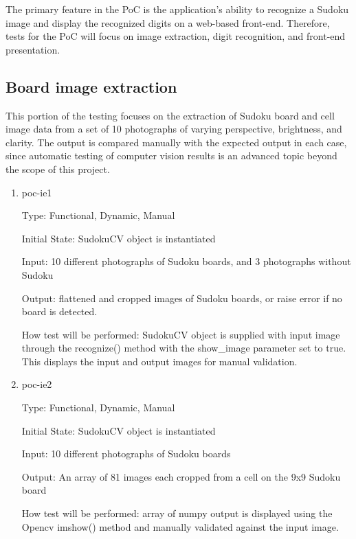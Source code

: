 \documentclass[11pt]{article}
\begin{document}
The primary feature in the PoC is the application's ability to recognize a Sudoku image and display the recognized digits on a web-based front-end. Therefore, tests for the PoC will focus on image extraction, digit recognition, and front-end presentation.

\subsection{Board image extraction}
		
This portion of the testing focuses on the extraction of Sudoku board and cell image data from a set of 10 photographs of varying perspective, brightness, and clarity. The output is compared manually with the expected output in each case, since automatic testing of computer vision results is an advanced topic beyond the scope of this project.

\begin{enumerate}

\item{poc-ie1\\}

Type: Functional, Dynamic, Manual
					
Initial State: SudokuCV object is instantiated
					
Input: 10 different photographs of Sudoku boards, and 3 photographs without Sudoku
					
Output: flattened and cropped images of Sudoku boards, or raise error if no board is detected.
					
How test will be performed: SudokuCV object is supplied with input image through the recognize() method with the show\_image parameter set to true. This displays the input and output images for manual validation.
					
\item{poc-ie2\\}

Type: Functional, Dynamic, Manual
					
Initial State: SudokuCV object is instantiated
					
Input: 10 different photographs of Sudoku boards
					
Output: An array of 81 images each cropped from a cell on the 9x9 Sudoku board
					
How test will be performed: array of numpy output is displayed using the Opencv imshow() method and manually validated against the input image.

\end{enumerate}
\end{document}
